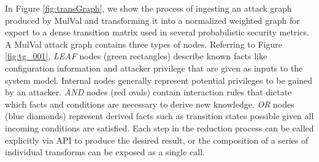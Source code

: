 


In Figure \ref{fig:transGraph}, we show the process of ingesting an attack graph produced by MulVal\cite{Ou_Appel_2005} and transforming it into a normalized weighted graph for export to a dense transition matrix used in several probabilistic security metrics. A MulVal attack graph contains three types of nodes. Referring to Figure \ref{fig:tg_001},  \textit{LEAF} nodes (green rectangles) describe known facts like configuration information and attacker privilege that are given as inputs to the system model. Internal nodes generally represent potential privileges to be gained by an attacker.  \textit{AND} nodes (red ovals) contain interaction rules that dictate which facts and conditions are necessary to derive new knowledge. \textit{OR} nodes (blue diamonds) represent derived facts such as transition states possible given all incoming conditions are satisfied. Each step in the reduction process can be called explicitly via API to produce the desired result, or the composition of a series of individual transforms can be exposed as a single call.  

